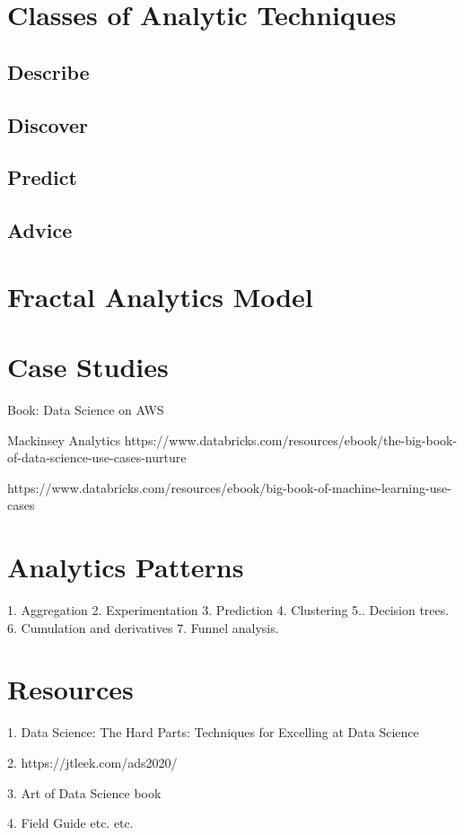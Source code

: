 \documentclass{rapportECL}
\begin{document}
\section{Classes of Analytic Techniques}

\subsection{Describe}


\subsection{Discover}


\subsection{Predict}


\subsection{Advice}


\section{Fractal Analytics Model}









\section{Case Studies}


Book: Data Science on AWS

Mackinsey Analytics https://www.databricks.com/resources/ebook/the-big-book-of-data-science-use-cases-nurture 

https://www.databricks.com/resources/ebook/big-book-of-machine-learning-use-cases 

\section{Analytics Patterns}


1. Aggregation
2. Experimentation
3. Prediction
4. Clustering
5.. Decision trees.
6. Cumulation and derivatives
7. Funnel analysis.


\section{Resources}

1. Data Science: The Hard Parts: Techniques for Excelling at Data Science

2. https://jtleek.com/ads2020/ 

3. Art of Data Science book 

4. Field Guide etc. etc. 
\end{document}
